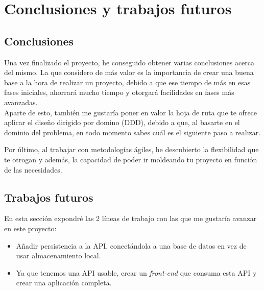 \chapter{Conclusiones y trabajos futuros}

\section{Conclusiones}
Una vez finalizado el proyecto, he conseguido obtener varias conclusiones acerca del mismo.
La que considero de más valor es la importancia de crear una buena base a la hora de realizar un proyecto, debido a que ese tiempo de más 
en esas fases iniciales, ahorrará mucho tiempo y otorgará facilidades en fases más avanzadas.\\

Aparte de esto, también me gustaría poner en valor la hoja de ruta que te ofrece aplicar el diseño dirigido por domino (DDD), debido a que,
al basarte en el dominio del problema, en todo momento sabes cuál es el siguiente paso a realizar.

Por último, al trabajar con metodologías ágiles, he descubierto la flexibilidad que te otrogan y además, la capacidad de poder ir moldeando tu
proyecto en función de las necesidades.

\section{Trabajos futuros}

En esta sección expondré las 2 líneas de trabajo con las que me gustaría avanzar en este proyecto:

\begin{itemize}
    \item Añadir persistencia a la API, conectándola a una base de datos en vez de usar almacenamiento local.
    \item Ya que tenemos una API usable, crear un \textit{front-end} que consuma esta API y crear una aplicación completa.
\end{itemize} 
